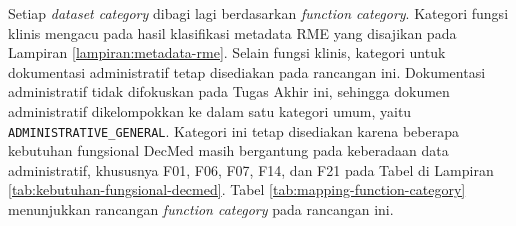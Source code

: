 \documentclass[bahasa, 12pt, a4paper, onecolumn, oneside, final]{report}
\begin{document}
Setiap \textit{dataset category} dibagi lagi berdasarkan \textit{function category}. Kategori fungsi klinis mengacu pada hasil klasifikasi metadata RME yang disajikan pada Lampiran \ref{lampiran:metadata-rme}. Selain fungsi klinis, kategori untuk dokumentasi administratif tetap disediakan pada rancangan ini. Dokumentasi administratif tidak difokuskan pada Tugas Akhir ini, sehingga dokumen administratif dikelompokkan ke dalam satu kategori umum, yaitu \texttt{ADMINISTRATIVE\_GENERAL}. Kategori ini tetap disediakan karena beberapa kebutuhan fungsional DecMed masih bergantung pada keberadaan data administratif, khususnya F01, F06, F07, F14, dan F21 pada Tabel di Lampiran \ref{tab:kebutuhan-fungsional-decmed}. Tabel \ref{tab:mapping-function-category} menunjukkan rancangan \textit{function category} pada rancangan ini.
\end{document}
